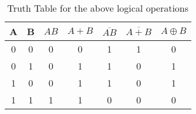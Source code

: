 \documentclass{scrartcl}
\begin{document}
\begin{table}[H]
    \centering
    \label{tab:truth_table}
    \renewcommand{\arraystretch}{1.5} %
    \begin{tabular}{|c|c||c|c|c|c|c|}
    \hline
    \textbf{A} & \textbf{B} & {$AB$} & {$A + B$} & {$\overline{AB}$} & {$\overline{A+B}$} & {$A \oplus B$} \\
    \hline
    0 & 0 & 0 & 0 & 1 & 1 & 0 \\
    0 & 1 & 0 & 1 & 1 & 0 & 1 \\
    1 & 0 & 0 & 1 & 1 & 0 & 1 \\
    1 & 1 & 1 & 1 & 0 & 0 & 0 \\
    \hline
    \end{tabular}
    \renewcommand{\arraystretch}{1} %
    \caption{Truth Table for the above logical operations}
\end{table}
\end{document}
